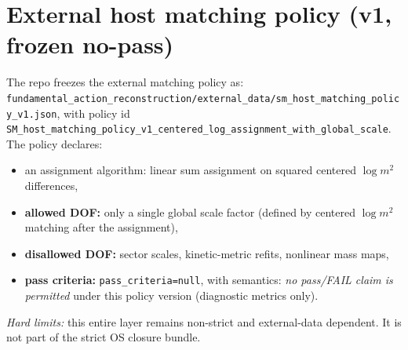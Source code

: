 \documentclass[11pt,a4paper]{article}
\begin{document}
\section{External host matching policy (v1, frozen no-pass)}

The repo freezes the external matching policy as:
\verb|fundamental_action_reconstruction/external_data/sm_host_matching_policy_v1.json|,
with policy id \texttt{SM\_host\_matching\_policy\_v1\_centered\_log\_assignment\_with\_global\_scale}.
The policy declares:
\begin{itemize}
  \item an assignment algorithm: linear sum assignment on squared centered $\log m^2$ differences,
  \item \textbf{allowed DOF:} only a single global scale factor (defined by centered $\log m^2$ matching after the assignment),
  \item \textbf{disallowed DOF:} sector scales, kinetic-metric refits, nonlinear mass maps,
  \item \textbf{pass criteria:} \texttt{pass\_criteria=null}, with semantics: \emph{no pass/FAIL claim is permitted} under this policy version (diagnostic metrics only).
\end{itemize}

\emph{Hard limits:} this entire layer remains non-strict and external-data dependent. It is not part of the strict OS closure bundle.
\end{document}
